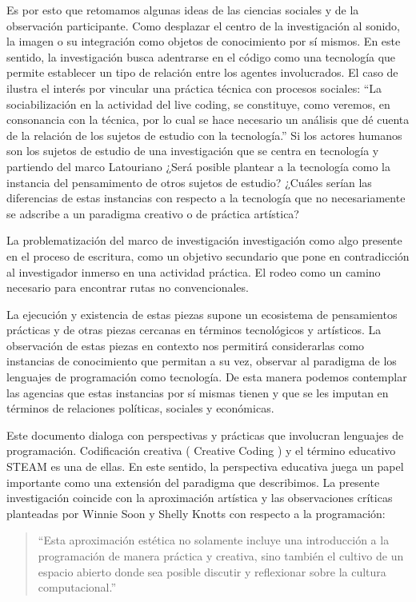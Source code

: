 Es por esto que retomamos algunas ideas de las ciencias sociales y de la observación participante. Como desplazar el centro de la investigación al sonido, la imagen o su integración como objetos de conocimiento por sí mismos. En este sentido, la investigación busca adentrarse en el código como una tecnología que permite establecer un tipo de relación entre los agentes involucrados. El caso de \cite{diProspero} ilustra el interés por vincular una práctica técnica con procesos sociales: ``La sociabilización en la actividad del live coding, se constituye, como veremos, en consonancia con la técnica, por lo cual se hace necesario un análisis que dé cuenta de la relación de los sujetos de estudio con la tecnología.''\citep[p.~48]{diProspero} Si los actores humanos son los sujetos de estudio de una investigación que se centra en tecnología y partiendo del marco Latouriano ¿Será posible plantear a la tecnología como la instancia del pensamimento de otros sujetos de estudio? ¿Cuáles serían las diferencias de estas instancias con respecto a la tecnología que no necesariamente se adscribe a un paradigma creativo o de práctica artística?

La problematización del marco de investigación investigación como algo presente en el proceso de escritura, como un objetivo secundario que pone en contradicción al investigador inmerso en una actividad práctica. El rodeo como un camino necesario para encontrar rutas no convencionales.

La ejecución y existencia de estas piezas supone un ecosistema de pensamientos prácticas y de otras piezas cercanas en términos tecnológicos y artísticos. La observación de estas piezas en contexto nos permitirá considerarlas como instancias de conocimiento que permitan a su vez, observar al paradigma de los lenguajes de programación como tecnología. De esta manera podemos contemplar las agencias que estas instancias por sí mismas tienen y que se les imputan en términos de relaciones políticas, sociales y económicas.

Este documento dialoga con perspectivas y prácticas que involucran lenguajes de programación. Codificación creativa ( Creative Coding ) y el término educativo \gls{STEAM} es una de ellas. En este sentido, la perspectiva educativa juega un papel importante como una extensión del paradigma que describimos. La presente investigación coincide con la aproximación artística y las observaciones críticas planteadas por Winnie Soon y Shelly Knotts con respecto a la programación:

\begin{quote}
  ``Esta aproximación estética no solamente incluye una introducción a la programación de manera práctica y creativa, sino también el cultivo de un espacio abierto donde sea posible discutir y reflexionar sobre la cultura computacional.''\citep[p.~87]{soonKnotts}

\end{quote}
  

